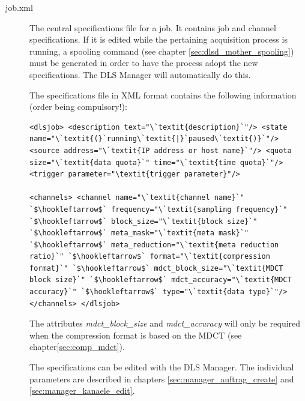 \documentclass[a4paper,12pt,BCOR6mm,bibtotoc,idxtotoc]{scrbook}
\begin{document}
\begin{description} 
\item[job.xml] The central specifications file for a job. It contains job and channel specifications. If it is edited while the pertaining acquisition process is running, a spooling command (see chapter \ref{sec:dlsd_mother_spooling}) must be generated in order to have the process adopt the new specifications. The DLS Manager will automatically do this.

The specifications file in XML format contains the following information (order being compulsory!):

\begin{lstlisting}[gobble=4] <dlsjob> <description text="\`textit{description}`"/> <state name="\`textit{(}`running\`textit{|}`paused\`textit{)}`"/> <source address="\`textit{IP address or host name}`"/> <quota size="\`textit{data quota}`" time="\`textit{time quota}`"/> <trigger parameter="\textit{trigger parameter}"/>

<channels> <channel name="\`textit{channel name}`" `$\hookleftarrow$` frequency="\`textit{sampling frequency}`" `$\hookleftarrow$` block_size="\`textit{block size}`" `$\hookleftarrow$` meta_mask="\`textit{meta mask}`" `$\hookleftarrow$` meta_reduction="\`textit{meta reduction ratio}`" `$\hookleftarrow$` format="\`textit{compression format}`" `$\hookleftarrow$` mdct_block_size="\`textit{MDCT block size}`" `$\hookleftarrow$` mdct_accuracy="\`textit{MDCT accuracy}`" `$\hookleftarrow$` type="\`textit{data type}`"/> </channels> </dlsjob> \end{lstlisting}

The attributes \textit{mdct\_block\_size} and \textit{mdct\_accuracy} will only be required when the compression format is based on the MDCT (see chapter\ref{sec:comp_mdct}).

The specifications can be edited with the DLS Manager. The individual parameters are described in chapters \ref{sec:manager_auftrag_create} and \ref{sec:manager_kanaele_edit}.



\end{description}
\end{document}
